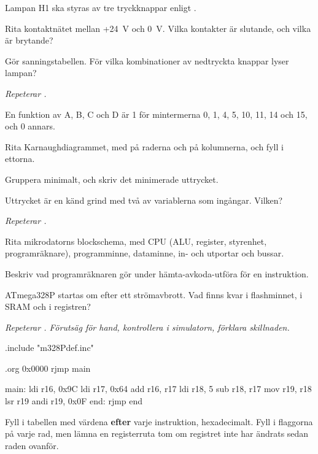 Lampan H1 ska styras av tre tryckknappar enligt .
\begin{parts}
  \item Rita kontaktnätet mellan +24~V och 0~V. Vilka kontakter är slutande, och vilka är
    brytande?
  \item Gör sanningstabellen. För vilka kombinationer av nedtryckta knappar lyser lampan?
\end{parts}

\label{c12:ex:8}
\emph{Repeterar .}

En funktion av A, B, C och D är 1 för mintermerna 0, 1, 4, 5, 10, 11, 14 och 15, och 0 annars.
\begin{parts}
  \item Rita Karnaughdiagrammet, med  på raderna och  på kolumnerna, och fyll i
    ettorna.
  \item Gruppera minimalt, och skriv det minimerade uttrycket.
  \item Uttrycket är en känd grind med två av variablerna som ingångar. Vilken?
\end{parts}

\label{c12:ex:9}
\emph{Repeterar .}
\begin{parts}
  \item Rita mikrodatorns blockschema, med CPU (ALU, register, styrenhet, programräknare),
    programminne, dataminne, in- och utportar och bussar.
  \item Beskriv vad programräknaren gör under hämta-avkoda-utföra för en instruktion.
  \item ATmega328P startas om efter ett strömavbrott. Vad finns kvar i flashminnet, i SRAM och i
    registren?
\end{parts}

\label{c12:ex:10}
\emph{Repeterar . Förutsäg för hand, kontrollera i simulatorn, förklara
skillnaden.}

\begin{asmcode}
.include "m328Pdef.inc"

.org 0x0000
    rjmp main

main:
    ldi r16, 0x9C
    ldi r17, 0x64
    add r16, r17
    ldi r18, 5
    sub r18, r17
    mov r19, r18
    lsr r19
    andi r19, 0x0F
end:
    rjmp end
\end{asmcode}

Fyll i tabellen med värdena \textbf{efter} varje instruktion, hexadecimalt. Fyll i flaggorna på
varje rad, men lämna en registerruta tom om registret inte har ändrats sedan raden ovanför.


